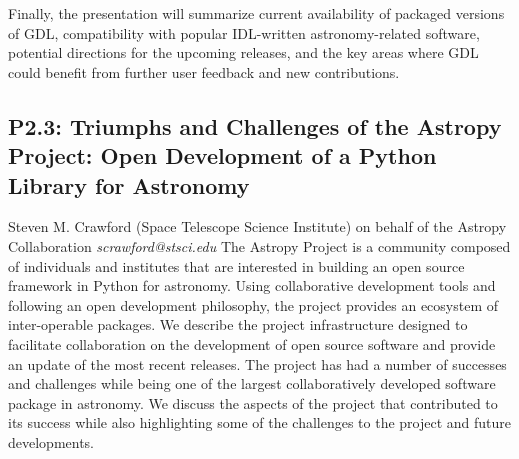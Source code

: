 \documentclass{report}
\begin{document}
Finally, the presentation will summarize current availability of 
packaged versions of GDL, compatibility with popular IDL-written 
astronomy-related software, potential directions for the upcoming 
releases, and the key areas where GDL could benefit from further user 
feedback and new contributions.\newline
\newpage
\subsection*{P2.3: Triumphs and Challenges of the Astropy Project: Open Development of a Python Library for Astronomy}
\bigskip
Steven M. Crawford (Space Telescope Science Institute) \newline   \newline   \newline   \newline  \newline  on behalf of the Astropy Collaboration\newline\newline
{\it scrawford@stsci.edu}\newline
\newline\newline
The Astropy Project is a community composed of individuals and institutes that are interested in building an open source framework in Python for astronomy.  Using collaborative development tools and following an open development philosophy, the project provides an ecosystem of inter-operable packages.   We describe the project infrastructure designed to facilitate collaboration on the development of open source software and provide an update of the most recent releases.   The project has had a number of successes and challenges while being one of the largest collaboratively developed software package in astronomy.  We discuss the aspects of the project that contributed to its success while also highlighting some of the challenges to the project and future developments.\newline
\newpage
\end{document}
